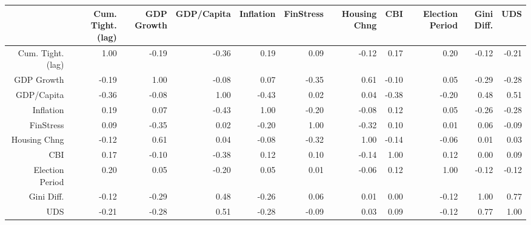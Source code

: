 \begin{table}[ht]
\centering
\begingroup\tiny
\begin{tabular}{rrrrrrrrrrr}
  \hline
 & Cum. Tight. (lag) & GDP Growth & GDP/Capita & Inflation & FinStress & Housing Chng & CBI & Election Period & Gini Diff. & UDS \\ 
  \hline
Cum. Tight. (lag) & 1.00 & -0.19 & -0.36 & 0.19 & 0.09 & -0.12 & 0.17 & 0.20 & -0.12 & -0.21 \\ 
  GDP Growth & -0.19 & 1.00 & -0.08 & 0.07 & -0.35 & 0.61 & -0.10 & 0.05 & -0.29 & -0.28 \\ 
  GDP/Capita & -0.36 & -0.08 & 1.00 & -0.43 & 0.02 & 0.04 & -0.38 & -0.20 & 0.48 & 0.51 \\ 
  Inflation & 0.19 & 0.07 & -0.43 & 1.00 & -0.20 & -0.08 & 0.12 & 0.05 & -0.26 & -0.28 \\ 
  FinStress & 0.09 & -0.35 & 0.02 & -0.20 & 1.00 & -0.32 & 0.10 & 0.01 & 0.06 & -0.09 \\ 
  Housing Chng & -0.12 & 0.61 & 0.04 & -0.08 & -0.32 & 1.00 & -0.14 & -0.06 & 0.01 & 0.03 \\ 
  CBI & 0.17 & -0.10 & -0.38 & 0.12 & 0.10 & -0.14 & 1.00 & 0.12 & 0.00 & 0.09 \\ 
  Election Period & 0.20 & 0.05 & -0.20 & 0.05 & 0.01 & -0.06 & 0.12 & 1.00 & -0.12 & -0.12 \\ 
  Gini Diff. & -0.12 & -0.29 & 0.48 & -0.26 & 0.06 & 0.01 & 0.00 & -0.12 & 1.00 & 0.77 \\ 
  UDS & -0.21 & -0.28 & 0.51 & -0.28 & -0.09 & 0.03 & 0.09 & -0.12 & 0.77 & 1.00 \\ 
   \hline
\end{tabular}
\endgroup
\end{table}
